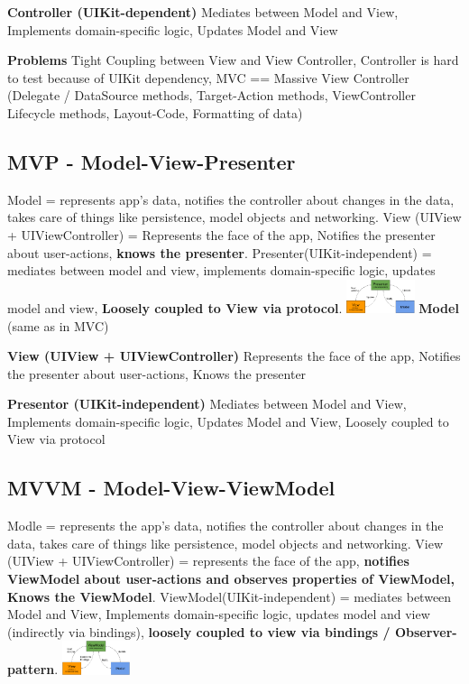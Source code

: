 \textbf{Controller (UIKit-dependent)}
Mediates between Model and View,
Implements domain-specific logic,
Updates Model and View

\textbf{Problems}
Tight Coupling between View and View Controller,
Controller is hard to test because of UIKit dependency,
MVC == Massive View Controller (Delegate / DataSource methods, Target-Action
methods, ViewController Lifecycle methods, Layout-Code, Formatting of data)

\subsection{MVP - Model-View-Presenter}
Model = represents app's data, notifies the controller about changes in the data, takes care of things like persistence, model objects and networking. View (UIView + UIViewController) = Represents the face of the app, Notifies the presenter about user-actions, \textbf{knows the presenter}. Presenter(UIKit-independent) = mediates between model and view, implements domain-specific logic, updates model and view, \textbf{Loosely coupled to View via protocol}.
\includegraphics[width=0.15\textwidth]{mvp.png}
\textbf{Model} (same as in MVC)

\textbf{View (UIView + UIViewController)}
Represents the face of the app,
Notifies the presenter about user-actions,
Knows the presenter

\textbf{Presentor (UIKit-independent)}
Mediates between Model and View,
Implements domain-specific logic,
Updates Model and View,
Loosely coupled to View via protocol

\subsection{MVVM - Model-View-ViewModel}
Modle = represents the app's data, notifies the controller about changes in the data, takes care of things like persistence, model objects and networking. View (UIView + UIViewController) = represents the face of the app, \textbf{notifies ViewModel about user-actions and observes properties of ViewModel, Knows the ViewModel}. ViewModel(UIKit-independent) = mediates between Model and View, Implements domain-specific logic, updates model and view (indirectly via bindings), \textbf{loosely coupled to view via bindings / Observer-pattern}.
\includegraphics[width=0.15\textwidth]{mvvm.png}

